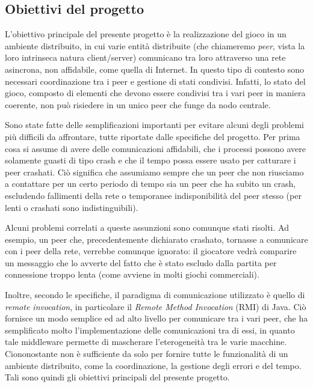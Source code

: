 \documentclass[9pt]{article}
\begin{document}
\subsection{Obiettivi del progetto}

L'obiettivo principale del presente progetto è la realizzazione del gioco in un ambiente distribuito, in cui varie entità distribuite (che chiameremo \emph{peer}, vista la loro intrinseca natura client/server) comunicano tra loro attraverso una rete asincrona, non affidabile, come quella di Internet. In questo tipo di contesto sono necessari coordinazione tra i peer e gestione di stati condivisi. Infatti, lo stato del gioco, composto di elementi che devono essere condivisi tra i vari peer in maniera coerente, non può risiedere in un unico peer che funge da nodo centrale.

Sono state fatte delle semplificazioni importanti per evitare alcuni degli problemi più difficili da affrontare, tutte riportate dalle specifiche del progetto. Per prima cosa si assume di avere delle comunicazioni affidabili, che i processi possono avere solamente guasti di tipo crash e che il tempo possa essere usato per catturare i peer crashati. Ciò significa che assumiamo sempre che un peer che non riusciamo a contattare per un certo periodo di tempo sia un peer che ha subito un crash, escludendo fallimenti della rete o temporanee indisponibilità del peer stesso (per lenti o crashati sono indistinguibili). 

Alcuni problemi correlati a queste assunzioni sono comunque stati risolti. Ad esempio, un peer che, precedentemente dichiarato crashato, tornasse a comunicare con i peer della rete, verrebbe comunque ignorato: il giocatore vedrà comparire un messaggio che lo avverte del fatto che è stato escludo dalla partita per connessione troppo lenta (come avviene in molti giochi commerciali).

Inoltre, secondo le specifiche, il paradigma di comunicazione utilizzato è quello di \emph{remote invocation}, in particolare il \emph{Remote Method Invocation} (RMI) di Java. Ciò fornisce un modo semplice ed ad alto livello per comunicare tra i vari peer, che ha semplificato molto l'implementazione delle comunicazioni tra di essi, in quanto tale middleware permette di mascherare l'eterogeneità tra le varie macchine. Ciononostante non è sufficiente da solo per fornire tutte le funzionalità di un ambiente distribuito, come la coordinazione, la gestione degli errori e del tempo. Tali sono quindi gli obiettivi principali del presente progetto.
\end{document}
